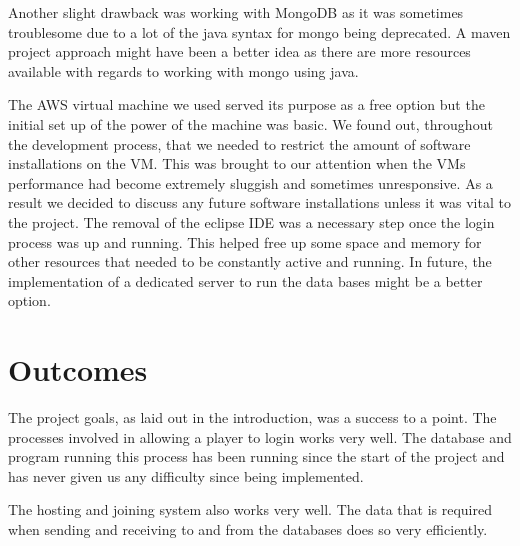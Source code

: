 Another slight drawback was working with MongoDB as it was sometimes troublesome due to a lot of the java syntax for mongo being deprecated. A maven project approach might have been a better idea as there are more resources available with regards to working with mongo using java. 
\newline

The AWS virtual machine we used served its purpose as a free option but the initial set up of the power of the machine was basic. We found out, throughout the development process, that we needed to restrict the amount of software installations on the VM. This was brought to our attention when the VMs performance had become extremely sluggish and sometimes unresponsive. As a result we decided to discuss any future software installations unless it was vital to the project. The removal of the eclipse IDE was a necessary step once the login process was up and running. This helped free up some space and memory for other resources that needed to be constantly active and running. In future, the implementation of a dedicated server to run the data bases might be a better option.

\section{Outcomes}
The project goals, as laid out in the introduction, was a success to a point. The processes involved in allowing a player to login works very well. The database and program running this process has been running since the start of the project and has never given us any difficulty since being implemented.
\newline

The hosting and joining system also works very well. The data that is required when sending and receiving to and from the databases does so very efficiently.    






